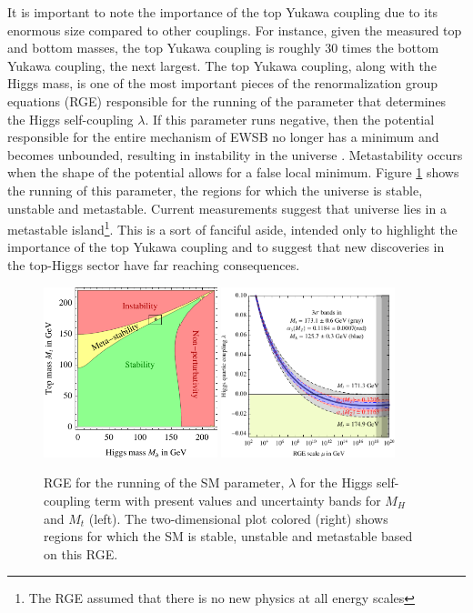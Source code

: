 It is important to note the importance of the top Yukawa coupling
due to its enormous size compared to other couplings. For instance, given the measured top and bottom
masses, the top Yukawa coupling is roughly 30 times the bottom Yukawa coupling, the next
largest. The top Yukawa coupling,
along with the Higgs mass, is one of the most important pieces of the renormalization group equations (RGE)
responsible for the running of the parameter that determines the Higgs self-coupling $\lambda$. 
If this parameter runs negative, then the potential responsible for the entire mechanism 
of EWSB no longer has a minimum and becomes unbounded, resulting in instability in the universe \cite{Degrassi:2012ry}.
Metastability occurs when the shape of the potential allows for a false local minimum.
Figure \ref{figure:theory_stability} shows the running of this parameter, the regions
for which the universe is stable, unstable and metastable. Current
measurements suggest that universe lies in a metastable island\footnote{The
RGE assumed that there is no new physics at all energy scales}. This is a sort of fanciful
aside, intended only to highlight the importance of the top Yukawa coupling and to suggest that
new discoveries in the top-Higgs sector have far reaching consequences. 


\begin{figure}[!t]
\centering 
\includegraphics[width=0.45\textwidth]{figs/theory/SMstability.pdf}
\includegraphics[width=0.45\textwidth]{figs/theory/runLambda.pdf}
\caption {
  RGE for the running of the SM parameter, $\lambda$ for the Higgs self-coupling term 
  with present values and uncertainty bands for $M_H$ and $M_t$ (left). The two-dimensional
  plot colored (right) shows regions for which the SM is stable, unstable and metastable
  based on this RGE.}

\label{figure:theory_stability}

\end{figure}


